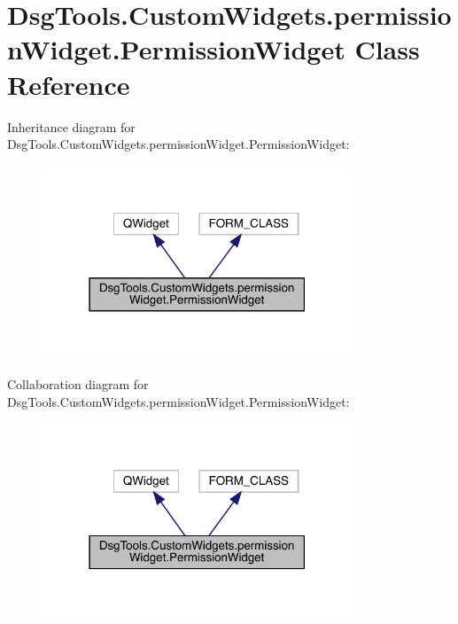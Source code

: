 \hypertarget{class_dsg_tools_1_1_custom_widgets_1_1permission_widget_1_1_permission_widget}{}\section{Dsg\+Tools.\+Custom\+Widgets.\+permission\+Widget.\+Permission\+Widget Class Reference}
\label{class_dsg_tools_1_1_custom_widgets_1_1permission_widget_1_1_permission_widget}


Inheritance diagram for Dsg\+Tools.\+Custom\+Widgets.\+permission\+Widget.\+Permission\+Widget\+:
\nopagebreak
\begin{figure}[H]
\begin{center}
\leavevmode
\includegraphics[width=262pt]{class_dsg_tools_1_1_custom_widgets_1_1permission_widget_1_1_permission_widget__inherit__graph}
\end{center}
\end{figure}


Collaboration diagram for Dsg\+Tools.\+Custom\+Widgets.\+permission\+Widget.\+Permission\+Widget\+:
\nopagebreak
\begin{figure}[H]
\begin{center}
\leavevmode
\includegraphics[width=262pt]{class_dsg_tools_1_1_custom_widgets_1_1permission_widget_1_1_permission_widget__coll__graph}
\end{center}
\end{figure}
